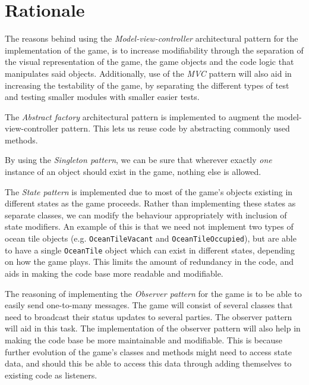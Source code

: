 \chapter{Rationale}
    

The reasons behind using the \emph{Model-view-controller} architectural pattern for the implementation of the game, is to increase modifiability through the separation of the visual representation of the game, the game objects and the code logic that manipulates said objects. Additionally, use of the \emph{MVC} pattern will also aid in increasing the testability of the game, by separating the different types of test and testing smaller modules with smaller easier tests.

The \emph{Abstract factory} architectural pattern is implemented to augment the model-view-controller pattern. This lets us reuse code by abstracting commonly used methods.


By using the \emph{Singleton pattern}, we can be sure that wherever exactly \emph{one} instance of an object should exist in the game, nothing else is allowed.





The \emph{State pattern} is implemented due to most of the game's objects existing in different states as the game proceeds. Rather than implementing these states as separate classes, we can modify the behaviour appropriately with inclusion of state modifiers. An example of this is that we need not implement two types of ocean tile objects (e.g. \texttt{OceanTileVacant} and \texttt{OceanTileOccupied}), but are able to have a single \texttt{OceanTile} object which can exist in different states, depending on how the game plays. This limits the amount of redundancy in the code, and aids in making the code base more readable and modifiable.


The reasoning of implementing the \emph{Observer pattern} for the game is to be able to easily send one-to-many messages. The game will consist of several classes that need to broadcast their status updates to several parties. The observer pattern will aid in this task. The implementation of the observer pattern will also help in making the code base be more maintainable and modifiable. This is because further evolution of the game's classes and methods might need to access state data, and should this be able to access this data through adding themselves to existing code as listeners.